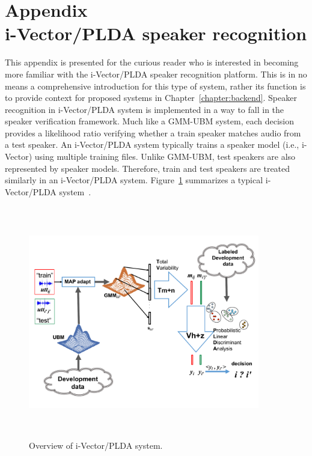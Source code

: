 \chapter*{Appendix\\i-Vector/PLDA speaker recognition}
\label{appendix:ivector_plda_spkr_id}

This appendix is presented for the curious reader who is interested in becoming more familiar with the i-Vector/PLDA speaker recognition platform. 
This is in no means a comprehensive introduction for this type of system, rather its function is to provide context for proposed systems in Chapter~\ref{chapter:backend}. 
Speaker recognition in i-Vector/PLDA system is implemented in a way to fall in the speaker verification framework. 
Much like a GMM-UBM system, each decision provides a likelihood ratio verifying whether a train speaker matches audio from a test speaker. 
An i-Vector/PLDA system typically trains a speaker model (i.e., i-Vector) using multiple training files. 
Unlike GMM-UBM, test speakers are also represented by speaker models. 
Therefore, train and test speakers are treated similarly in an i-Vector/PLDA system. 
Figure~\ref{fig:ivector_plda} summarizes a typical i-Vector/PLDA system~\cite{dehak2011front}. 

\renewcommand{\thefigure}{A.\arabic{figure}}
\setcounter{figure}{0}
\begin{figure}[h!]
	\centering
	\vspace{0mm} 
	\includegraphics[height = 4in, width=0.9\textwidth]{figures/ivector_plda}
	\vspace{-3mm}
	\caption{Overview of i-Vector/PLDA system.}
	\label{fig:ivector_plda}
	\vspace{-3mm}
\end{figure}

